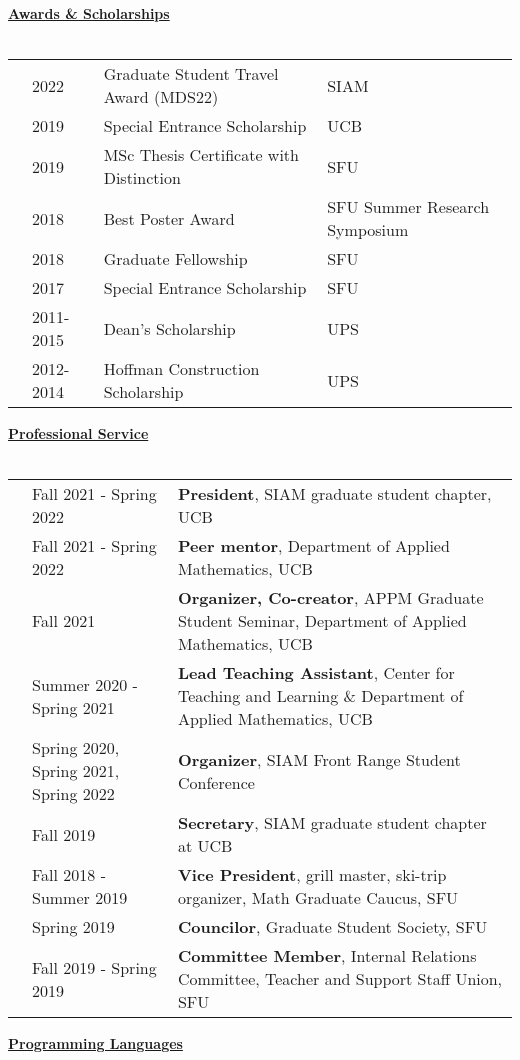 \documentclass[letterpaper,11pt,oneside]{article}
\newcommand{\headr}[1]{\vspace{10pt}\uline{\Large{\textbf{#1}} \hfill } \\ \vspace{-10pt}\\}
\begin{document}
\headr{Awards \& Scholarships}

\begin{tabular}{@{} p{0.01cm} p{2cm} p{9cm} p{8cm}}
& 2022 & Graduate Student Travel Award (MDS22) & SIAM \\
& 2019 & Special Entrance Scholarship & UCB \\
& 2019 & MSc Thesis Certificate with Distinction & SFU \\
& 2018 & Best Poster Award & SFU Summer Research Symposium \\
& 2018 & Graduate Fellowship & SFU \\
& 2017 & Special Entrance Scholarship & SFU \\
&2011-2015 & Dean’s Scholarship & UPS\\
&2012-2014 & Hoffman Construction Scholarship & UPS\\ 
\end{tabular}
\newpage
\headr{Professional Service}

\begin{tabular}{@{} p{0.01cm} p{4.5cm} p{12cm}}
& Fall 2021 - Spring 2022 & \textbf{President}, SIAM graduate student chapter, UCB\\
& Fall 2021 - Spring 2022  & \textbf{Peer mentor}, Department of Applied Mathematics, UCB\\
& Fall 2021  & \textbf{Organizer, Co-creator}, APPM Graduate Student Seminar, Department of Applied Mathematics, UCB\\
& Summer 2020 - Spring 2021 & \textbf{Lead Teaching Assistant}, Center for Teaching and Learning \& Department of Applied Mathematics, UCB\\
& Spring 2020, Spring 2021, Spring 2022  & \textbf{Organizer}, SIAM Front Range Student Conference \\
& Fall 2019  & \textbf{Secretary}, SIAM graduate student chapter at UCB\\
& Fall 2018 - Summer 2019 & \textbf{Vice President}, grill master, ski-trip organizer, Math Graduate Caucus, SFU\\
& Spring 2019 & \textbf{Councilor}, Graduate Student Society, SFU\\
& Fall 2019 - Spring 2019 & \textbf{Committee Member}, Internal Relations Committee, Teacher and Support Staff Union, SFU \\
\end{tabular}

\headr{Programming Languages}
\end{document}
